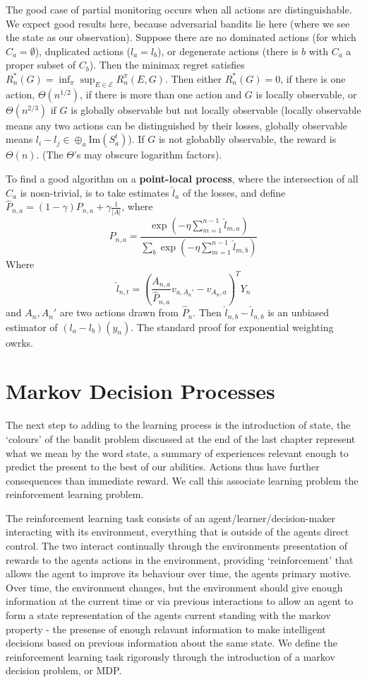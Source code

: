 The good case of partial monitoring occurs when all actions are distinguishable. We expect good results here, because adversarial bandits lie here (where we see the state as our observation). Suppose there are no dominated actions (for which $C_a = \emptyset$), duplicated actions ($l_a = l_b$), or degenerate actions (there is $b$ with $C_a$ a proper subset of $C_b$). Then the minimax regret satisfies $R_n^*(G) = \inf_\pi \sup_{E \in \mathcal{E}} R_n^\pi(E, G)$. Then either $R_n^*(G) = 0$, if there is one action, $\Theta(n^{1/2})$, if there is more than one action and $G$ is locally observable, or $\Theta(n^{2/3})$ if $G$ is globally observable but not locally observable (locally observable means any two actions can be distinguished by their losses, globally observable means $l_i - l_j \in \oplus_a \text{Im}(S_a^t)$). If $G$ is not globablly observable, the reward is $\Theta(n)$. (The $\Theta$'s may obscure logarithm factors).

To find a good algorithm on a {\bf point-local process}, where the intersection of all $C_a$ is nosn-trivial, is to take estimates $\hat{l}_a$ of the losses, and define $\hat{P}_{n,a} = (1 - \gamma) P_{n,a} + \gamma \frac{1}{|A|}$, where
%
\[ P_{n,a} = \frac{\exp(- \eta \sum_{m = 1}^{n-1} \hat{l}_{m,a})}{\sum_b \exp(- \eta \sum_{m = 1}^{n-1} \hat{l}_{m,b})} \]
%
Where
%
\[ \hat{l}_{n,t} = \left( \frac{A_{n,a}}{\hat{P}_{n,a}} v_{a,A_n'} - v_{A_n,a} \right)^T Y_n \]
%
and $A_n, A_n'$ are two actions drawn from $\hat{P}_n$. Then $\hat{l}_{n,b} - \hat{l}_{n,b}$ is an unbiased estimator of $(l_a - l_b)(y_n)$. The standard proof for exponential weighting owrks.

\chapter{Markov Decision Processes}

The next step to adding to the learning process is the introduction of state, the `colours' of the bandit problem discussed at the end of the last chapter represent what we mean by the word state, a summary of experiences relevant enough to predict the present to the best of our abilities. Actions thus have further consequences than immediate reward. We call this associate learning problem the reinforcement learning problem.

The reinforcement learning task consists of an agent/learner/decision-maker interacting with its environment, everything that is outside of the agents direct control. The two interact continually through the environments presentation of rewards to the agents actions in the environment, providing `reinforcement' that allows the agent to improve its behaviour over time, the agents primary motive. Over time, the environment changes, but the environment should give enough information at the current time or via previous interactions to allow an agent to form a state representation of the agents current standing with the markov property - the presense of enough relavant information to make intelligent decisions based on previous information about the same state. We define the reinforcement learning task rigorously through the introduction of a markov decision problem, or MDP.

